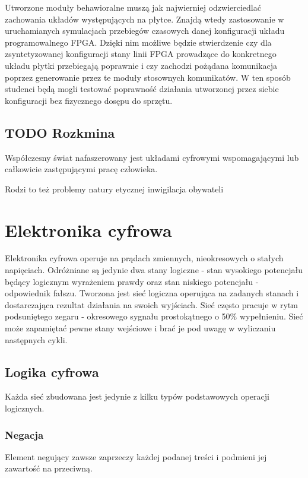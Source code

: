 \documentclass[a4paper,12pt]{article}
\begin{document}
Utworzone moduły behawioralne muszą jak najwierniej odzwierciedlać zachowania układów występujących na płytce.
Znajdą wtedy zastosowanie w uruchamianych symulacjach przebiegów czasowych danej konfiguracji układu programowalnego FPGA. Dzięki nim możliwe będzie stwierdzenie czy dla zsyntetyzowanej konfiguracji stany linii FPGA prowadzące do konkretnego układu płytki przebiegają poprawnie i czy zachodzi pożądana komunikacja poprzez generowanie przez te moduły stosownych komunikatów. W ten sposób studenci będą mogli testować poprawność działania utworzonej przez siebie konfiguracji bez fizycznego dosępu do sprzętu.

\subsection{TODO Rozkmina}

Współczesny świat nafaszerowany jest układami cyfrowymi wspomagającymi lub całkowicie zastępującymi pracę człowieka.

Rodzi to też problemy natury etycznej inwigilacja obywateli

\section{Elektronika cyfrowa}
Elektronika cyfrowa operuje na prądach zmiennych, nieokresowych o stałych napięciach. Odróżniane są jedynie dwa stany logiczne - stan wysokiego potencjału będący logicznym wyrażeniem prawdy oraz stan niskiego potencjału - odpowiednik fałszu. Tworzona jest sieć logiczna operująca na zadanych stanach i dostarczająca rezultat działania na swoich wyjściach. Sieć często pracuje w rytm podsuniętego zegaru - okresowego sygnału prostokątnego o 50\% wypełnieniu. Sieć może zapamiętać pewne stany wejściowe i brać je pod uwagę w wyliczaniu następnych cykli.

\subsection{Logika cyfrowa}
Każda sieć zbudowana jest jedynie z kilku typów podstawowych operacji logicznych.

\subsubsection{Negacja}
Element negujący zawsze zaprzeczy każdej podanej treści i podmieni jej zawartość na przeciwną.
\end{document}
